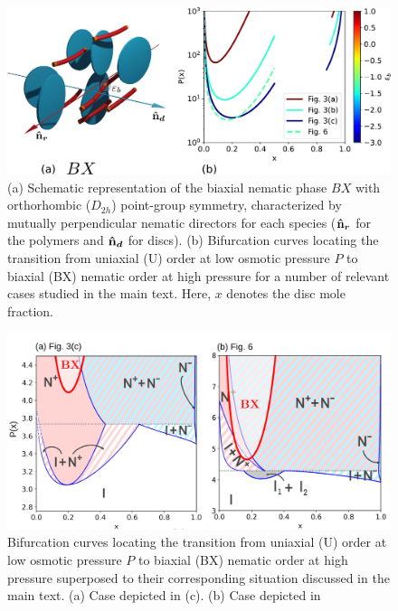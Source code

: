 \begin{subappendices}
\begin{figure}[ht]
  \includegraphics[width=.9 \textwidth]{figures/chapter-2/FIG7}
\caption[Schematic representation of the biaxial nematic phase $BX$ with orthorhombic ($D_{2h}$) point-group  symmetry]{(a) Schematic representation of the biaxial nematic phase $BX$ with orthorhombic ($D_{2h}$) point-group  symmetry, characterized by mutually perpendicular nematic directors for each species ($\bm{\hat{\textnormal{\bfseries n}}_r}$ for the polymers and $\bm{\hat{\textnormal{\bfseries n}}_d}$ for discs). (b) Bifurcation curves locating the transition from uniaxial (U) order at low osmotic pressure $P$ to biaxial (BX) nematic order at high pressure for a number of relevant cases studied in the main text. Here, $x$ denotes the disc mole fraction.  }
\label{fig:bx}
\end{figure}



\begin{figure}
  \includegraphics[width=.9 \textwidth]{figures/chapter-2/biaxial-altered}
\caption[Bifurcation curves superposed to their corresponding phase diagram]{ Bifurcation curves locating the transition from uniaxial (U) order at low osmotic pressure $P$ to biaxial (BX) nematic order at high pressure superposed to their corresponding situation discussed in the main text. (a) Case depicted in (c). (b) Case depicted in    }
\label{fig:bx2}
\end{figure}


\end{subappendices}

